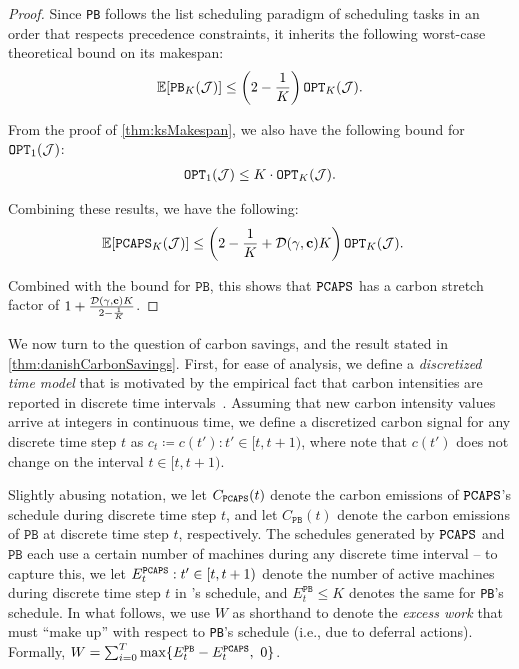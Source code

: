 \begin{proof}
Since \texttt{PB} follows the list scheduling paradigm of scheduling tasks in an order that respects precedence constraints, it inherits the following worst-case theoretical bound on  its makespan:
\begin{align*}
\mathbb{E} [ \texttt{PB}_K(\mathcal{J}) ] \le \left(2 - \frac{1}{K} \right) \texttt{OPT}_K(\mathcal{J}).
\end{align*}

From the proof of \autoref{thm:ksMakespan}, we also have the following bound for $\texttt{OPT}_1(\mathcal{J})$:
\begin{align*}
\texttt{OPT}_1(\mathcal{J}) \le K\cdot \texttt{OPT}_K(\mathcal{J}).
\end{align*}

Combining these results, we have the following:
\begin{align*}
\mathbb{E} [ \texttt{PCAPS}_K(\mathcal{J}) ] &\le \left(2 - \frac{1}{K} + \mathcal{D}(\gamma, {\mathbf{c}}) K \right) \texttt{OPT}_K(\mathcal{J}).
\end{align*}

Combined with the bound for $\texttt{PB}$, this shows that $\texttt{PCAPS}$ has a carbon stretch factor of $1 + \frac{\mathcal{D}(\gamma, {\mathbf{c}}) K}{2 - \frac{1}{K}}$.

\end{proof}

We now turn to the question of carbon savings, and the result stated in \autoref{thm:danishCarbonSavings}. 
First, for ease of analysis, we define a \textit{discretized time model} that is motivated by the empirical fact that carbon intensities are reported in discrete time intervals~\cite{electricity-map, watttime}.
Assuming that new carbon intensity values arrive at integers in continuous time, we define a discretized carbon signal for any discrete time step $t$ as $c_{t} \coloneqq c(t') : t' \in [t, t+1)$, where note that $c(t')$ does not change on the interval $t \in [t, t+1)$.

Slightly abusing notation, we let $C_{\texttt{PCAPS}}(t)$ denote the carbon emissions of $\texttt{PCAPS}$'s schedule during discrete time step $t$, and let $C_{\texttt{PB}}(t)$ denote the carbon emissions of $\texttt{PB}$ at discrete time step $t$, respectively.  
The schedules generated by $\texttt{PCAPS}$ and $\texttt{PB}$ each use a certain number of machines during any discrete time interval -- to capture this, we let $E^\texttt{PCAPS}_t : t' \in [t, t+1)$ denote the number of active machines during discrete time step $t$ in \DANISH's schedule, and $E^\texttt{PB}_t \leq K$ denotes the same for \texttt{PB}'s schedule.  In what follows, we use $W$ as shorthand to denote the \textit{excess work} that \DANISH must ``make up'' with respect to \texttt{PB}'s schedule (i.e., due to deferral actions). Formally, $W = \sum_{i=0}^T \max\{ E^\texttt{PB}_t - E^\texttt{PCAPS}_t , \ 0 \}$.

